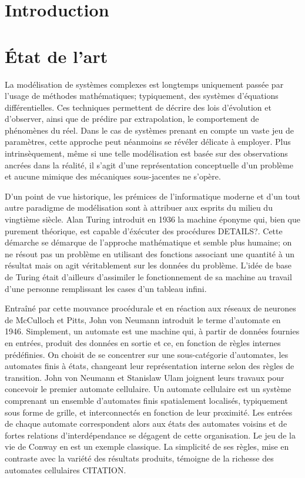 \documentclass[10pt]{article}
\begin{document}
\begin{multicols}{2}

\section{Introduction}

\section{\'Etat de l'art}

La modélisation de systèmes complexes est longtemps uniquement passée
par l'usage de méthodes mathématiques; typiquement, des systèmes
d'équations différentielles. Ces techniques permettent de décrire des
lois d'évolution et d'observer, ainsi que de prédire par
extrapolation, le comportement de phénomènes du réel. Dans le cas de
systèmes prenant en compte un vaste jeu de paramètres, cette approche
peut néanmoins se révéler délicate à employer. Plus intrinsèquement,
même si une telle modélisation est basée sur des observations ancrées
dans la réalité, il s'agit d'une représentation conceptuelle d'un
problème et aucune mimique des mécaniques sous-jacentes ne s'opère.

D'un point de vue historique, les prémices de l'informatique moderne
et d'un tout autre paradigme de modélisation sont à attribuer aux
esprits du milieu du vingtième siècle. Alan Turing introduit en 1936
la machine éponyme qui, bien que purement théorique, est capable
d'éxécuter des procédures DETAILS?. Cette démarche se démarque de
l'approche mathématique et semble plus humaine; on ne résout pas un
problème en utilisant des fonctions associant une quantité à un
résultat mais on agit véritablement sur les données du
problème. L'idée de base de Turing était d'ailleurs d'assimiler le
fonctionnement de sa machine au travail d'une personne remplissant les
cases d'un tableau infini.

Entraîné par cette mouvance procédurale et en réaction aux réseaux de
neurones de McCulloch et Pitts, John von Neumann introduit le terme
d'automate en 1946. Simplement, un automate est une machine qui, à
partir de données fournies en entrées, produit des données en sortie
et ce, en fonction de règles internes prédéfinies. On choisit de se
concentrer sur une sous-catégorie d'automates, les automates finis à
états, changeant leur représentation interne selon des règles de
transition. John von Neumann et Stanislaw Ulam joignent leurs travaux
pour concevoir le premier automate cellulaire. Un automate cellulaire
est un système comprenant un ensemble d'automates finis spatialement
localisés, typiquement sous forme de grille, et interconnectés en
fonction de leur proximité. Les entrées de chaque automate
correspondent alors aux états des automates voisins et de fortes
relations d'interdépendance se dégagent de cette organisation. Le jeu
de la vie de Conway en est un exemple classique. La simplicité de ses
règles, mise en contraste avec la variété des résultats produits,
témoigne de la richesse des automates cellulaires CITATION.


\end{multicols}
\end{document}

